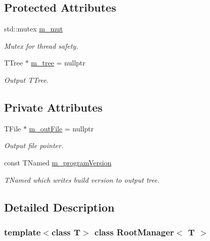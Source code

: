 \subsection*{Protected Attributes}
\begin{DoxyCompactItemize}
\item 
std\+::mutex \hyperlink{class_root_manager_a8f8a185d6d25b3e1207416c7cd8c333c}{m\+\_\+mut}
\begin{DoxyCompactList}\small\item\em Mutex for thread safety. \end{DoxyCompactList}\item 
T\+Tree $\ast$ \hyperlink{class_root_manager_adfbcbba0248787d08a230508bb4136a6}{m\+\_\+tree} = nullptr
\begin{DoxyCompactList}\small\item\em Output T\+Tree. \end{DoxyCompactList}\end{DoxyCompactItemize}
\subsection*{Private Attributes}
\begin{DoxyCompactItemize}
\item 
T\+File $\ast$ \hyperlink{class_root_manager_a2f0257574f0eeac21c3628058a5d6ad9}{m\+\_\+out\+File} = nullptr
\begin{DoxyCompactList}\small\item\em Output file pointer. \end{DoxyCompactList}\item 
const T\+Named \hyperlink{class_root_manager_a14d81290e5a98ec6f62459f1016e7dcc}{m\+\_\+program\+Version}
\begin{DoxyCompactList}\small\item\em T\+Named which writes build version to output tree. \end{DoxyCompactList}\end{DoxyCompactItemize}


\subsection{Detailed Description}
\subsubsection*{template$<$class T$>$\newline
class Root\+Manager$<$ T $>$}


